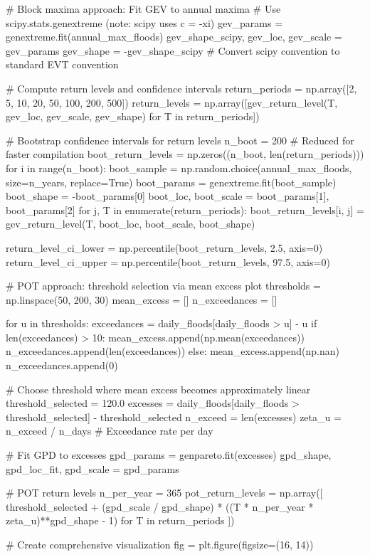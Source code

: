 \documentclass[a4paper, 11pt]{article}
\begin{document}
\begin{pycode}
# Block maxima approach: Fit GEV to annual maxima
# Use scipy.stats.genextreme (note: scipy uses c = -xi)
gev_params = genextreme.fit(annual_max_floods)
gev_shape_scipy, gev_loc, gev_scale = gev_params
gev_shape = -gev_shape_scipy  # Convert scipy convention to standard EVT convention

# Compute return levels and confidence intervals
return_periods = np.array([2, 5, 10, 20, 50, 100, 200, 500])
return_levels = np.array([gev_return_level(T, gev_loc, gev_scale, gev_shape)
                          for T in return_periods])

# Bootstrap confidence intervals for return levels
n_boot = 200  # Reduced for faster compilation
boot_return_levels = np.zeros((n_boot, len(return_periods)))
for i in range(n_boot):
    boot_sample = np.random.choice(annual_max_floods, size=n_years, replace=True)
    boot_params = genextreme.fit(boot_sample)
    boot_shape = -boot_params[0]
    boot_loc, boot_scale = boot_params[1], boot_params[2]
    for j, T in enumerate(return_periods):
        boot_return_levels[i, j] = gev_return_level(T, boot_loc, boot_scale, boot_shape)

return_level_ci_lower = np.percentile(boot_return_levels, 2.5, axis=0)
return_level_ci_upper = np.percentile(boot_return_levels, 97.5, axis=0)

# POT approach: threshold selection via mean excess plot
thresholds = np.linspace(50, 200, 30)
mean_excess = []
n_exceedances = []

for u in thresholds:
    exceedances = daily_floods[daily_floods > u] - u
    if len(exceedances) > 10:
        mean_excess.append(np.mean(exceedances))
        n_exceedances.append(len(exceedances))
    else:
        mean_excess.append(np.nan)
        n_exceedances.append(0)

# Choose threshold where mean excess becomes approximately linear
threshold_selected = 120.0
excesses = daily_floods[daily_floods > threshold_selected] - threshold_selected
n_exceed = len(excesses)
zeta_u = n_exceed / n_days  # Exceedance rate per day

# Fit GPD to excesses
gpd_params = genpareto.fit(excesses)
gpd_shape, gpd_loc_fit, gpd_scale = gpd_params

# POT return levels
n_per_year = 365
pot_return_levels = np.array([
    threshold_selected + (gpd_scale / gpd_shape) * ((T * n_per_year * zeta_u)**gpd_shape - 1)
    for T in return_periods
])

# Create comprehensive visualization
fig = plt.figure(figsize=(16, 14))


\end{pycode}
\end{document}
